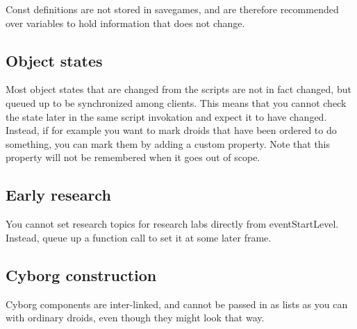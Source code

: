 \documentclass[12pt]{article}
\begin{document}
Const definitions are not stored in savegames, and are therefore recommended over variables to hold information 
that does not change.

\subsection{Object states}
Most object states that are changed from the scripts are not in fact changed, but queued up to be synchronized
among clients. This means that you cannot check the state later in the same script invokation and expect it to
have changed. Instead, if for example you want to mark droids that have been ordered to do something, you can
mark them by adding a custom property. Note that this property will not be remembered when it goes out of scope.

\subsection{Early research}
You cannot set research topics for research labs directly from eventStartLevel. Instead, queue up a function
call to set it at some later frame.

\subsection{Cyborg construction}
Cyborg components are inter-linked, and cannot be passed in as lists as you can with ordinary droids, even
though they might look that way.
\end{document}
